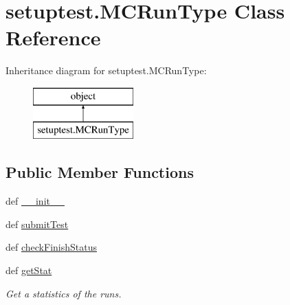 \hypertarget{classsetuptest_1_1_m_c_run_type}{\section{setuptest.\-M\-C\-Run\-Type Class Reference}
\label{classsetuptest_1_1_m_c_run_type}
}
Inheritance diagram for setuptest.\-M\-C\-Run\-Type\-:\begin{figure}[H]
\begin{center}
\leavevmode
\includegraphics[height=2.000000cm]{classsetuptest_1_1_m_c_run_type}
\end{center}
\end{figure}
\subsection*{Public Member Functions}
\begin{DoxyCompactItemize}
\item 
def \hyperlink{classsetuptest_1_1_m_c_run_type_a291ead26e72bb3ded1a7248f87a554b2}{\-\_\-\-\_\-init\-\_\-\-\_\-}
\item 
def \hyperlink{classsetuptest_1_1_m_c_run_type_a4a474d1557bac832e58e9ce56f242156}{submit\-Test}
\item 
def \hyperlink{classsetuptest_1_1_m_c_run_type_a6713b47776d33b8025e6b09416f957f3}{check\-Finish\-Status}
\item 
def \hyperlink{classsetuptest_1_1_m_c_run_type_a186dd2614f1ce577d282b2ed35b0dc93}{get\-Stat}
\begin{DoxyCompactList}\small\item\em Get a statistics of the runs. \end{DoxyCompactList}\end{DoxyCompactItemize}
